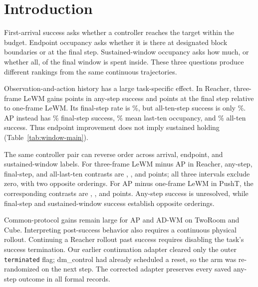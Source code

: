\documentclass[manuscript,screen,review]{jair}
\begin{document}
\maketitle

\section{Introduction}
\IntroExampleSentence{} First-arrival success asks whether a controller reaches the target within the budget. Endpoint occupancy asks whether it is there at designated block boundaries or at the final step. Sustained-window occupancy asks how much, or whether all, of the final window is spent inside. These three questions produce different rankings from the same continuous trajectories.

Observation-and-action history has a large task-specific effect. In Reacher, three-frame LeWM gains \ReacherHistoryDeltaRevision{} points in any-step success and \ReacherHistoryFinalCI{} points at the final step relative to one-frame LeWM. Its final-step rate is \ReacherLeWMThreeFinal\%, but all-ten-step success is only \RfourReacherThreeAllTen\%. AP instead has \ReacherAPFinal\% final-step success, \RfourReacherAPOccTen\% mean last-ten occupancy, and \RfourReacherAPAllTen\% all-ten success. Thus endpoint improvement does not imply sustained holding (Table~\ref{tab:window-main}).

The same controller pair can reverse order across arrival, endpoint, and sustained-window labels. For three-frame LeWM minus AP in Reacher, any-step, final-step, and all-last-ten contrasts are \RfourReacherThreeAPAny{}, \RfourReacherThreeAPFinal{}, and \RfiveReacherThreeAPAllTen{} points; all three intervals exclude zero, with two opposite orderings. For AP minus one-frame LeWM in PushT, the corresponding contrasts are \APLeWMPushTAnyCI{}, \APLeWMPushTFinalCI{}, and \RfourWindowSix{} points. Any-step success is unresolved, while final-step and sustained-window success establish opposite orderings.

Common-protocol gains remain large for AP and AD-WM on TwoRoom and Cube. Interpreting post-success behavior also requires a continuous physical rollout. Continuing a Reacher rollout past success requires disabling the task's success termination. Our earlier continuation adapter cleared only the outer \texttt{terminated} flag; dm\_control had already scheduled a reset, so the arm was re-randomized on the next step. The corrected adapter preserves every saved any-step outcome in all \RfourFormalCount{} formal records.
\end{document}
